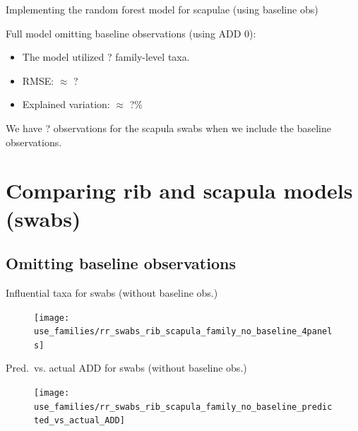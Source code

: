 \documentclass{beamer}
\begin{document}
\begin{frame}{Implementing the random forest model for scapulae (using baseline obs)}

  \noindent Full model omitting baseline observations (using ADD 0):
  \begin{itemize}
    \item The model utilized ? family-level taxa. 
    \item RMSE: $\approx$ ?
    \item Explained variation: $\approx$ ?\%
  \end{itemize}
  \vspace{0.1in}

  \noindent We have ? observations for the scapula swabs when we include the
  baseline observations.

\end{frame}



\section[Swabs from ribs and scapulae]{Comparing rib and scapula models (swabs)}


\subsection[No baseline]{Omitting baseline observations}

\begin{frame}{Influential taxa for swabs (without baseline obs.)}

  \begin{center}
    \begin{figure}
      \texttt{[image: use\_families/rr\_swabs\_rib\_scapula\_family\_no\_baseline\_4panels]}
    \end{figure}
  \end{center}

\end{frame}


\begin{frame}{Pred.\ vs. actual ADD for swabs (without baseline obs.)}

  \begin{center}
    \begin{figure}
      \texttt{[image: use\_families/rr\_swabs\_rib\_scapula\_family\_no\_baseline\_predicted\_vs\_actual\_ADD]}
    \end{figure}
  \end{center}

\end{frame}
\end{document}
